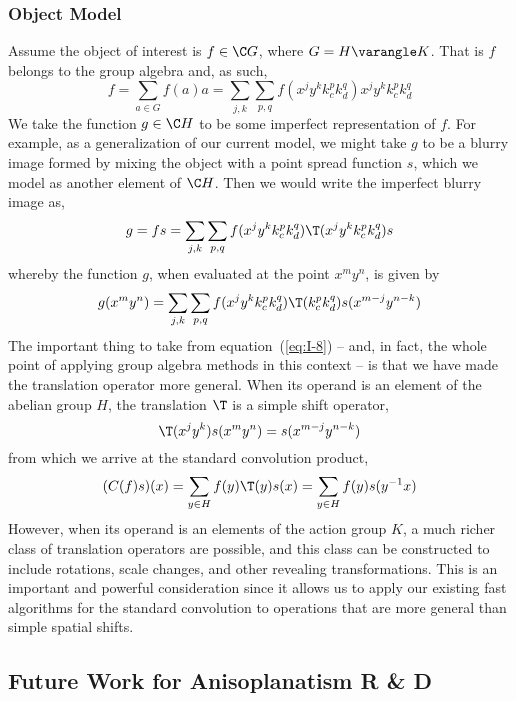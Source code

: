 \subsubsection{Object Model}
Assume the object of interest is $f\in \C G$, where $G = H\varangle K$.  That is
$f$ belongs to the group algebra and, as such,
\[ 
f = \sum_{a\in G} f(a) a = \sum_{j,k}\sum_{p,q} f(x^jy^kk_c^pk_d^q) x^jy^kk_c^pk_d^q
\]
We take the function $g\in \C H$ to be some imperfect representation of $f$.
For example, as a generalization of our current model, we might take $g$ to be a
blurry image formed by mixing the object with a point spread function $s$, which
we model as another element of $\C H$.  Then we would write the imperfect blurry
image as,
\[
g = fs = \sum_{j,k}\sum_{p,q} f(x^jy^kk_c^pk_d^q) \T(x^jy^kk_c^pk_d^q)s
\]
whereby the function $g$, when evaluated at the point $x^my^n$, is given by
\begin{equation}\label{eq:I-8}
g(x^my^n) = \sum_{j,k}\sum_{p,q} f(x^jy^kk_c^pk_d^q)
\T(k_c^pk_d^q)s(x^{m-j}y^{n-k})
\end{equation}
The important thing to take from equation~(\ref{eq:I-8}) -- and, in fact, the whole
point of applying group algebra methods in this context -- is that we have made
the translation operator more general.  When its operand is an element of the
abelian group $H$, the translation $\T$ is a simple shift operator,
\[
\T(x^jy^k)s(x^{m}y^{n}) =s(x^{m-j}y^{n-k})
\]
from which we arrive at the standard convolution product,
\[
(C(f)s)(x) = \sum_{y\in H} f(y)\T(y)s(x) = \sum_{y\in H} f(y)s(y^{-1}x)
\]
However, when its operand is an elements of the action group $K$,
a much richer class of translation operators are possible, and this class can be
constructed to include rotations, scale changes, and other revealing
transformations.  This is an important and powerful consideration since it
allows us to apply our existing fast algorithms for the standard convolution to
operations that are more general than simple spatial shifts.  

\subsection{Future Work for Anisoplanatism R \& D}
